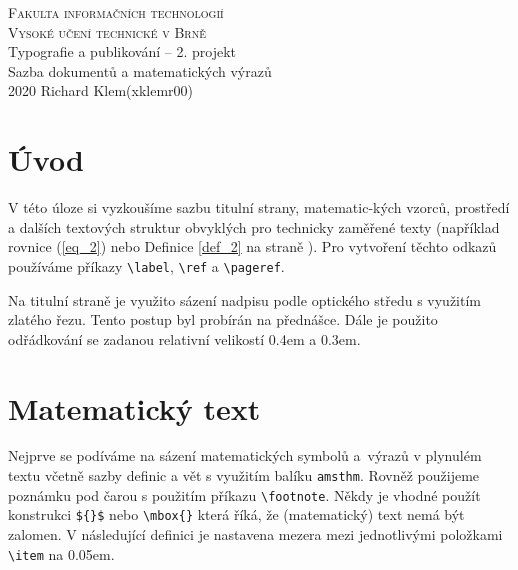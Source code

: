 \documentclass[11pt, twocolumn]{article}
\begin{document}
\begin{titlepage}
\begin{center}
\textsc{\Huge{
Fakulta informačních technologií\\[0.4em]
Vysoké učení technické v Brně}}\\
{\LARGE Typografie a publikování -- 2. projekt\\[0.3em]
Sazba dokumentů a matematických výrazů}\\
{\Large 2020 \hfill Richard Klem(xklemr00)}
\end{center}
\end{titlepage}
\section*{Úvod}
\noindent V této úloze si vyzkoušíme sazbu titulní strany, matematic-\break kých vzorců, prostředí a dalších textových struktur obvyklých
pro technicky zaměřené texty (například rovnice (\ref{eq_2}) nebo Definice \ref{def_2} na straně \pageref{def_2}). Pro vytvoření těchto odkazů
používáme příkazy 
\verb|\label|, \verb|\ref| a \verb|\pageref|.

Na titulní straně je využito sázení nadpisu podle optického
středu s využitím zlatého řezu. Tento postup byl
probírán na přednášce. Dále je použito odřádkování se
zadanou relativní velikostí 0.4em a 0.3em.
\section{Matematický text}
\noindent Nejprve se podíváme na sázení matematických symbolů
a~výrazů v plynulém textu včetně sazby definic a vět s využitím
balíku \verb|amsthm|. Rovněž použijeme poznámku pod
čarou s použitím příkazu \verb|\footnote|. Někdy je vhodné
použít konstrukci \verb|${}$| nebo \verb|\mbox{}|  která říká, že
(matematický) text nemá být zalomen. V následující definici
je nastavena mezera mezi jednotlivými položkami
\verb|\item| na 0.05em.
\end{document}
